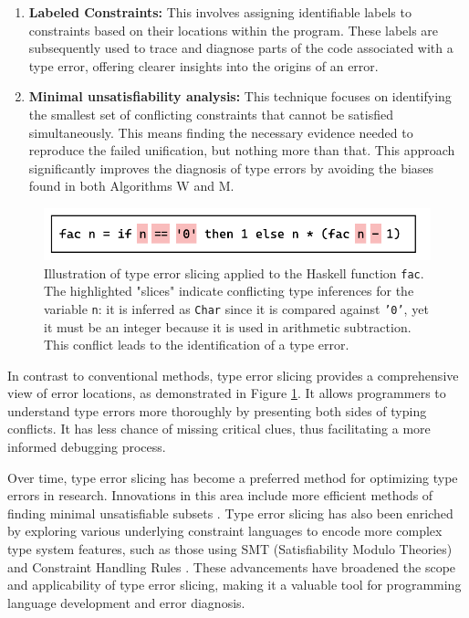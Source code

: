 \begin{enumerate}
  \item {
    \textbf{Labeled Constraints:}
    This involves assigning identifiable labels to constraints based on their locations within the program. These labels are subsequently used to trace and diagnose parts of the code associated with a type error, offering clearer insights into the origins of an error.
  }
  \item {
    \textbf{Minimal unsatisfiability analysis:} 
    This technique focuses on identifying the smallest set of conflicting constraints that cannot be satisfied simultaneously. This means finding the necessary evidence needed to reproduce the failed unification, but nothing more than that. This approach significantly improves the diagnosis of type errors by avoiding the biases found in both Algorithms W and M.
  }
\end{enumerate}


\begin{figure}[hbt]
  \includegraphics[width=0.8\linewidth]{TypeErrorSlicing.pdf}
  \caption{
    \label{fig:type-error-slicing}
    Illustration of type error slicing applied to the Haskell function \texttt{fac}. The highlighted "slices" indicate conflicting type inferences for the variable \texttt{n}: it is inferred as \texttt{Char} since it is compared against \texttt{'0'}, yet it must be an integer because it is used in arithmetic subtraction. This conflict leads to the identification of a type error.}
\end{figure}

In contrast to conventional methods, type error slicing provides a comprehensive view of error locations, as demonstrated in Figure \ref{fig:type-error-slicing}. It allows programmers to understand type errors more thoroughly by presenting both sides of typing conflicts. It has less chance of missing critical clues, thus facilitating a more informed debugging process.

Over time, type error slicing has become a preferred method for optimizing type errors in research. Innovations in this area include more efficient methods of finding minimal unsatisfiable subsets \cite{Liffiton2008-mx, Bailey2005-hi, Bacchus2015-of}. Type error slicing has also been enriched by exploring various underlying constraint languages to encode more complex type system features, such as those using SMT (Satisfiability Modulo Theories) \cite{Pavlinovic2015-ke} and Constraint Handling Rules \cite{Stuckey2003-pz}. These advancements have broadened the scope and applicability of type error slicing, making it a valuable tool for programming language development and error diagnosis.


